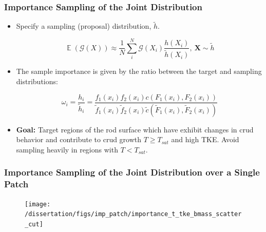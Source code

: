 \documentclass[t, pdftex]{beamer}
\DeclareMathOperator*{\E}{\mathbb{E}}
\begin{document}
\begin{frame}
\frametitle{Importance Sampling of the Joint Distribution}
\vspace{-16pt}
\begin{itemize}
    \item Specify a sampling (proposal) distribution, $\tilde h$.

\begin{equation}
\E(\mathcal G(X)) \approx \frac{1}{N} \sum_i^N \mathcal G(X_i) \frac{h(X_i)}{\tilde h(X_i)}, \ \mathbf{X} \sim \tilde{h} \nonumber
\label{eq:mc_imp_expected_crud}
\end{equation}

\item The sample importance is given by the ratio between the target and sampling distributions:
    
    \begin{equation}
    \omega_i = \frac{h_i}{\tilde h_i} = \frac{f_1(x_i) f_2(x_i)c(F_1(x_i), F_2(x_i))}{\tilde f_1(x_i) \tilde f_2(x_i) \tilde c(\tilde F_1(x_i), \tilde F_2(x_i))} \nonumber
    \label{eq:imp_prob_ratio}
    \end{equation}

    \item \textbf{Goal:}  Target regions of the rod surface which have exhibit changes in crud behavior and contribute to crud growth $T \ge T_{sat}$ and high TKE.  Avoid sampling heavily in regions with $T<T_{sat}$.
\end{itemize}
\end{frame}

\begin{frame}
\frametitle{\small Importance Sampling of the Joint Distribution over a Single Patch}
\vspace{-16pt}
\begin{figure}[!htbp]
    \centering
    \texttt{[image: /dissertation/figs/imp\_patch/importance\_t\_tke\_bmass\_scatter\_cut]}
    \label{model_overview}
\end{figure}
\end{frame}
\end{document}
